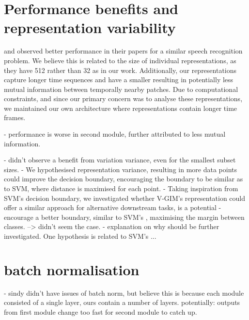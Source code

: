\section{Performance benefits and representation variability}
		\cite{oordRepresentationLearningContrastive2019} and \cite{lowePuttingEndEndtoEnd2020} observed better performance in their papers for a similar speech recognition problem. We believe this is related to the size of individual representations, as they have 512 rather than 32 as in our work. Additionally, our representations capture longer time sequences and have a smaller resulting in potentially less mutual information between temporally nearby patches. Due to computational constraints, and since our primary concern was to analyse these representations, we maintained our own architecture where representations contain longer time frames.


		- performance is worse in second module, further attributed to less mutual information.

		- didn't observe a benefit from variation variance, even for the smallest subset sizes.
		- We hypothesised representation variance, resulting in more data points could improve the decision boundary, encouraging the boundary to be similar as to SVM, where distance is maximised for each point.
		- Taking inspiration from SVM's decision boundary, we investigated whether V-GIM's representation could offer a similar approach for alternative downstream tasks, is a potential 
			- encourage a better boundary, similar to SVM's \citep{hearstSupportVectorMachines1998, nobleWhatSupportVector2006}, maximising the margin between classes.
			 --> didn't seem the case.
		- explanation on why should be further investigated. One hypothesis is related to SVM's ...
		
			
\section{batch normalisation}
		- sindy didn't have issues of batch norm, but believe this is because each module consisted of a single layer, ours contain a number of layers. potentially: outputs from first module change too fast for second module to catch up.
	
